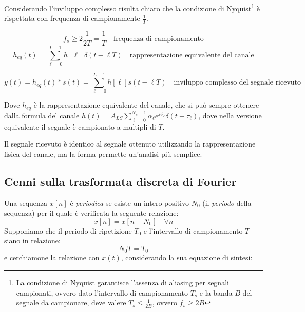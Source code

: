 Considerando l'inviluppo complesso risulta chiaro che la condizione di Nyquist\footnote{\label{nyquist_cond} La condizione di Nyquist garantisce l'assenza di aliasing per segnali campionati, ovvero dato l'intervallo di campionamento $T_s$ e la banda $B$ del segnale da campionare, deve valere $T_s \leq \frac{1}{2B}$, ovvero $f_s \geq 2B$} è rispettata con frequenza di campionamente $\frac{1}{T}$.



\[
    f_s \geq 2 \frac{1}{2T} = \frac{1}{T} \quad \text{frequenza di campionamento} 
\]
\[
    h_{eq}(t) = \sum_{\ell=0}^{L-1} h \left[\ell\right] \delta(t - \ell T) \quad \text{rappresentazione equivalente del canale}
\]

\[
    y(t) = h_{eq}(t) \ast s(t) = \sum_{\ell=0}^{L-1} h\left[\ell\right] s(t - \ell T) \quad \text{inviluppo complesso del segnale ricevuto}
\]

Dove $h_{eq}$ è la rappresentazione equivalente del canale, che si può sempre ottenere dalla formula del canale $ h(t) = A_{LS} \sum_{\ell=0}^{N_c-1} \alpha_{\ell} e^{j\phi_{\ell}} \delta(t - \tau_{\ell})$, dove nella versione equivalente il segnale è campionato a multipli di $T$.

Il segnale ricevuto è identico al segnale ottenuto utilizzando la rappresentazione fisica del canale, ma la forma permette un'analisi più semplice.
\subsection*{Cenni sulla trasformata discreta di Fourier}
Una sequenza \( x[n] \) è \textit{periodica} se esiste un intero positivo $N_0$ (il \textit{periodo} della sequenza) per il quale è verificata la seguente relazione:
\[
    x[n] = x[n + N_0] \quad \forall n
\]
Supponiamo che il periodo di ripetizione $T_0$ e l'intervallo di campionamento $T$ siano in relazione:
\[
    N_0 T = T_0
\]
e cerchiamone la relazione con $x(t)$, considerando la sua equazione di sintesi:


